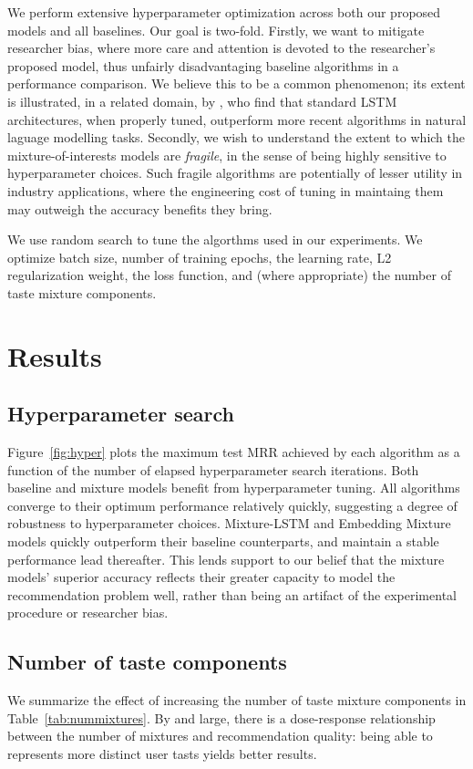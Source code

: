\documentclass[sigconf]{acmart}
\begin{document}
We perform extensive hyperparameter optimization across both our proposed models and all baselines. Our goal is two-fold. Firstly, we want to mitigate researcher bias, where more care and attention is devoted to the researcher's proposed model, thus unfairly disadvantaging baseline algorithms in a performance comparison. We believe this to be a common phenomenon; its extent is illustrated, in a related domain, by \cite{melis2017state}, who find that standard LSTM architectures, when properly tuned, outperform more recent algorithms in natural laguage modelling tasks. Secondly, we wish to understand the extent to which the mixture-of-interests models are \emph{fragile}, in the sense of being highly sensitive to hyperparameter choices. Such fragile algorithms are potentially of lesser utility in industry applications, where the engineering cost of tuning in maintaing them may outweigh the accuracy benefits they bring.

We use random search to tune the algorthms used in our experiments. We optimize batch size, number of training epochs, the learning rate, L2 regularization weight, the loss function, and (where appropriate) the number of taste mixture components.

\section{Results}

\subsection{Hyperparameter search}
Figure~\ref{fig:hyper} plots the maximum test MRR achieved by each algorithm as a function of the number of elapsed hyperparameter search iterations. Both baseline and mixture models benefit from hyperparameter tuning. All algorithms converge to their optimum performance relatively quickly, suggesting a degree of robustness to hyperparameter choices. Mixture-LSTM and Embedding Mixture models quickly outperform their baseline counterparts, and maintain a stable performance lead thereafter. This lends support to our belief that the mixture models' superior accuracy reflects their greater capacity to model the recommendation problem well, rather than being an artifact of the experimental procedure or researcher bias.

\subsection{Number of taste components}
We summarize the effect of increasing the number of taste mixture components in Table~\ref{tab:nummixtures}. By and large, there is a dose-response relationship between the number of mixtures and recommendation quality: being able to represents more distinct user tasts yields better results.
\end{document}
